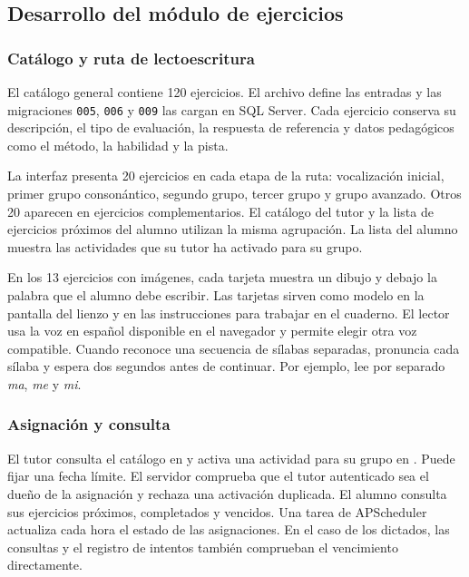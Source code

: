 \subsection{Desarrollo del módulo de ejercicios}

\subsubsection{Catálogo y ruta de lectoescritura}

El catálogo general contiene 120 ejercicios. El archivo  define las entradas y las migraciones \texttt{005}, \texttt{006} y \texttt{009} las cargan en SQL Server. Cada ejercicio conserva su descripción, el tipo de evaluación, la respuesta de referencia y datos pedagógicos como el método, la habilidad y la pista.

La interfaz presenta 20 ejercicios en cada etapa de la ruta: vocalización inicial, primer grupo consonántico, segundo grupo, tercer grupo y grupo avanzado. Otros 20 aparecen en ejercicios complementarios. El catálogo del tutor y la lista de ejercicios próximos del alumno utilizan la misma agrupación. La lista del alumno muestra las actividades que su tutor ha activado para su grupo.

En los 13 ejercicios con imágenes, cada tarjeta muestra un dibujo y debajo la palabra que el alumno debe escribir. Las tarjetas sirven como modelo en la pantalla del lienzo y en las instrucciones para trabajar en el cuaderno. El lector usa la voz en español disponible en el navegador y permite elegir otra voz compatible. Cuando reconoce una secuencia de sílabas separadas, pronuncia cada sílaba y espera dos segundos antes de continuar. Por ejemplo, lee por separado \textit{ma}, \textit{me} y \textit{mi}.

\subsubsection{Asignación y consulta}

El tutor consulta el catálogo en  y activa una actividad para su grupo en . Puede fijar una fecha límite. El servidor comprueba que el tutor autenticado sea el dueño de la asignación y rechaza una activación duplicada. El alumno consulta sus ejercicios próximos, completados y vencidos. Una tarea de APScheduler actualiza cada hora el estado de las asignaciones. En el caso de los dictados, las consultas y el registro de intentos también comprueban el vencimiento directamente.

